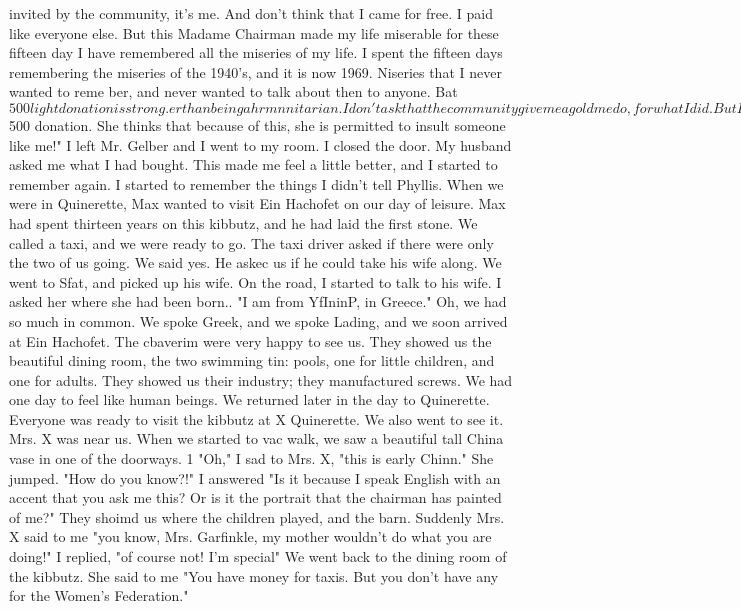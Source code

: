 invited by the community, it's me.
And don't think that I came for free.
I paid like 
everyone else.
But this Madame Chairman made my life miserable for these fifteen day 
I have remembered all the miseries of my life.
I spent the fifteen days remembering 
the miseries of the 1940's, and it is now 1969.
Niseries that I never wanted to reme 
ber, and never wanted to talk about then to anyone.
Bat $500 light donation is strong.
er than being a hrmnnitarian.
I don't ask that the community give me a gold medo, for 
what I did.
But I will not let myself be insulted any more, especially when it is 
owing from some ignorant person because she gave SAR a $500 donation.
She thinks 
that because of this, she is permitted to insult someone like me!"
I left Mr.
Gelber and I went to my room.
I closed the door.
My husband asked 
me what I had bought.
This made me feel a little better, and I started to remember 
again.
I started to remember the things I didn't tell Phyllis.
When we were in Quinerette, 
Max wanted to visit Ein Hachofet on our day of leisure.
Max had spent thirteen years 
on this kibbutz, and he had laid the first stone.
We called a taxi, and we were ready to 
go.
The taxi driver asked if there were only the two of us going.
We said yes.
He askec 
us if he could take his wife along.
We went to Sfat, and picked up his wife.
On the road, I started to talk to his wife.
I asked her where she had been born.. 
"I am from YfIninP, in Greece."
Oh, we had so much in common.
We spoke Greek, and we 
spoke Lading, and we soon arrived at Ein Hachofet.
The cbaverim were very happy to see us.
They showed us the beautiful dining room, 
the two swimming tin: pools, one for little children, and one for adults.
They showed 
us their industry; they manufactured screws.
We had one day to feel like human beings.
We returned later in the day to Quinerette.
Everyone was ready to visit the kibbutz at X Quinerette.
We also went to see it.
Mrs.
X was near us.
When we started to vac walk, we saw a beautiful tall China vase in 
one of the doorways.
1 
"Oh," I sad to Mrs.
X, "this is early Chinn."
She jumped.
"How do you know?!"
I answered "Is it because I speak English with an accent that you ask me this?
Or 
is it the portrait that the chairman has painted of me?"
They shoimd us where the children played, and the barn.
Suddenly Mrs.
X said to me 
"you know, Mrs.
Garfinkle, my mother wouldn't do what you are doing!"
I replied, "of 
course not!
I'm special" 
We went back to the dining room of the kibbutz.
She said to me "You have money 
for taxis.
But you don't have any for the Women's Federation."
